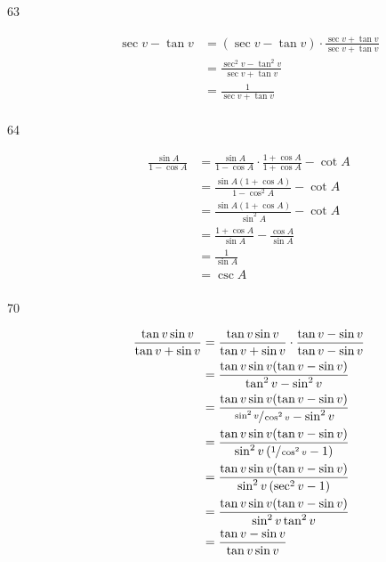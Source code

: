 \documentclass{exam}
\begin{document}
\begin{description}
      \item[63] 
        \begin{align*}
          \sec v - \tan v & = (\sec v - \tan v) \cdot \frac{\sec v + \tan v}{\sec v + \tan v} \\
                          & = \frac{\sec^2 v - \tan^2 v}{\sec v + \tan v} \\
                          & = \frac{1}{\sec v + \tan v} \\
        \end{align*}

      \item[64] 
        \begin{align*}
          \frac{\sin A}{1 - \cos A} & = \frac{\sin A}{1 - \cos A} \cdot \frac{1 + \cos A}{1 + \cos A} - \cot A \\
                                    & = \frac{\sin A ( 1 + \cos A )}{1 - \cos^2 A} - \cot A \\
                                    & = \frac{\sin A ( 1 + \cos A )}{\sin^2 A} - \cot A \\
                                    & = \frac{1 + \cos A}{\sin A} - \frac{\cos A}{\sin A} \\
                                    & = \frac{1}{\sin A} \\
                                    & = \csc A \\
        \end{align*}

      \item[70] 
        \begin{align*}
          \frac{\tan v \sin v}{\tan v + \sin v} & = \frac{\tan v \sin v}{\tan v + \sin v} \cdot \frac{\tan v - \sin v}{\tan v - \sin v} \\
                                                & = \frac{\tan v \sin v (\tan v - \sin v)}{\tan^2 v - \sin^2 v} \\
                                                & = \frac{\tan v \sin v (\tan v - \sin v)}{\sfrac{\sin^2 v}{\cos^2 v} - \sin^2 v} \\
                                                & = \frac{\tan v \sin v (\tan v - \sin v)}{\sin^2 v \left( \sfrac{1}{\cos^2 v} - 1 \right) } \\
                                                & = \frac{\tan v \sin v (\tan v - \sin v)}{\sin^2 v \left( \sec^2 v - 1 \right) } \\
                                                & = \frac{\tan v \sin v (\tan v - \sin v)}{\sin^2 v \tan^2 v } \\
                                                & = \frac{\tan v - \sin v}{\tan v \sin v } \\
        \end{align*}

    \end{description}
\end{document}
